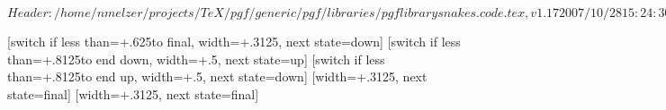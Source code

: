 %
%
%

\ProvidesFileRCS[v\pgfversion] $Header: /home/nmelzer/projects/TeX/pgf/generic/pgf/libraries/pgflibrarysnakes.code.tex,v 1.17 2007/10/28 15:24:30 vibrovski Exp $


\newdimen\pgfsnakesegmentamplitude
\newdimen\pgfsnakesegmentlength
\def\pgfsnakesegmentangle{45}
\def\pgfsnakesegmentobjectlength{\pgfsnakesegmentamplitude}
\def\pgfsnakesegmentaspect{0.5}

\pgfsnakesegmentlength=10pt
\pgfsnakesegmentamplitude=2.5pt



%
%

{
  [switch if less than=+.625\pgfsnakesegmentlength to final,
                  width=+.3125\pgfsnakesegmentlength,
                  next state=down]
  { 
    \pgfpathcurveto
    {\pgfqpoint{.125\pgfsnakesegmentlength}{0pt}}
    {\pgfqpoint{.1875\pgfsnakesegmentlength}{\pgfsnakesegmentamplitude}}
    {\pgfqpoint{.3125\pgfsnakesegmentlength}{\pgfsnakesegmentamplitude}}
  }
  [switch if less than=+.8125\pgfsnakesegmentlength to end down,
               width=+.5\pgfsnakesegmentlength,
               next state=up]
  {
    \pgfpathcosine{\pgfqpoint{.25\pgfsnakesegmentlength}{-1\pgfsnakesegmentamplitude}}
    \pgfpathsine{\pgfqpoint{.25\pgfsnakesegmentlength}{-1\pgfsnakesegmentamplitude}}
  }               
  [switch if less than=+.8125\pgfsnakesegmentlength to end up,
             width=+.5\pgfsnakesegmentlength,
             next state=down]
  {
    \pgfpathcosine{\pgfqpoint{.25\pgfsnakesegmentlength}{\pgfsnakesegmentamplitude}}
    \pgfpathsine{\pgfqpoint{.25\pgfsnakesegmentlength}{\pgfsnakesegmentamplitude}}
  }               
  [width=+.3125\pgfsnakesegmentlength,
                   next state=final]
  {
    \pgfpathcurveto
    {\pgfqpoint{.125\pgfsnakesegmentlength}{\pgfsnakesegmentamplitude}}
    {\pgfqpoint{.1875\pgfsnakesegmentlength}{0pt}}
    {\pgfqpoint{.3125\pgfsnakesegmentlength}{0pt}}
  }  
  [width=+.3125\pgfsnakesegmentlength,
                 next state=final]
  {
    \pgfpathcurveto
    {\pgfqpoint{.125\pgfsnakesegmentlength}{-\pgfsnakesegmentamplitude}}
    {\pgfqpoint{.1875\pgfsnakesegmentlength}{0pt}}
    {\pgfqpoint{.3125\pgfsnakesegmentlength}{0pt}}
  }  
  { \pgfpathlineto{\pgfqpoint{\pgfsnakeremainingdistance}{0pt}} }
}




